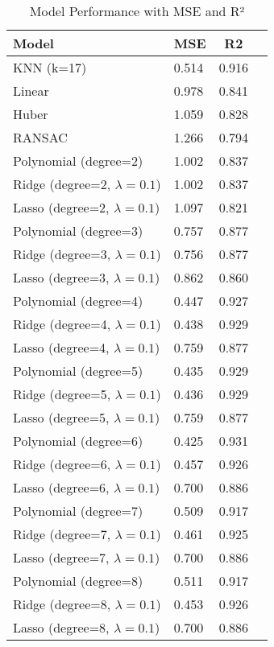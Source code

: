 \begin{table}
\centering
\caption{Model Performance with MSE and R²}
\label{tab:model_performance}
\begin{tabular}{|l|l|c|c|}
\toprule
                           Model &   MSE &    R2 \\
\midrule
                      KNN (k=17) & 0.514 & 0.916 \\
                          Linear & 0.978 & 0.841 \\
                           Huber & 1.059 & 0.828 \\
                          RANSAC & 1.266 & 0.794 \\
           Polynomial (degree=2) & 1.002 & 0.837 \\
 Ridge (degree=2, $\lambda=0.1$) & 1.002 & 0.837 \\
 Lasso (degree=2, $\lambda=0.1$) & 1.097 & 0.821 \\
           Polynomial (degree=3) & 0.757 & 0.877 \\
 Ridge (degree=3, $\lambda=0.1$) & 0.756 & 0.877 \\
 Lasso (degree=3, $\lambda=0.1$) & 0.862 & 0.860 \\
           Polynomial (degree=4) & 0.447 & 0.927 \\
 Ridge (degree=4, $\lambda=0.1$) & 0.438 & 0.929 \\
 Lasso (degree=4, $\lambda=0.1$) & 0.759 & 0.877 \\
           Polynomial (degree=5) & 0.435 & 0.929 \\
 Ridge (degree=5, $\lambda=0.1$) & 0.436 & 0.929 \\
 Lasso (degree=5, $\lambda=0.1$) & 0.759 & 0.877 \\
           Polynomial (degree=6) & 0.425 & 0.931 \\
 Ridge (degree=6, $\lambda=0.1$) & 0.457 & 0.926 \\
 Lasso (degree=6, $\lambda=0.1$) & 0.700 & 0.886 \\
           Polynomial (degree=7) & 0.509 & 0.917 \\
 Ridge (degree=7, $\lambda=0.1$) & 0.461 & 0.925 \\
 Lasso (degree=7, $\lambda=0.1$) & 0.700 & 0.886 \\
           Polynomial (degree=8) & 0.511 & 0.917 \\
 Ridge (degree=8, $\lambda=0.1$) & 0.453 & 0.926 \\
 Lasso (degree=8, $\lambda=0.1$) & 0.700 & 0.886 \\

\end{tabular}
\end{table}
